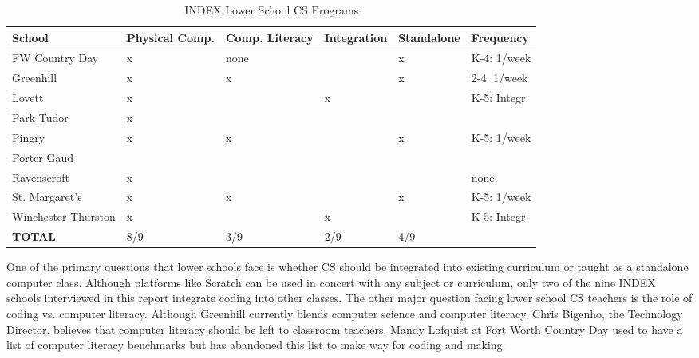 \begin{table}[]
\centering
\caption{INDEX Lower School CS Programs}
\label{indexLS}
\begin{tabular}{|l|p{1.6cm}|p{1.6cm}|p{2cm}|p{2cm}|p{2.2cm}|}\hline
\textbf{School} & \textbf{Physical Comp.}& \textbf{Comp. Literacy}& \textbf{Integration}&\textbf{Standalone}&\textbf{Frequency}  \\ \hline
FW Country Day 	& x	
				& none					%
				&						%
				& x						%
				& K-4: 1/week \\		%
Greenhill 		& x
				& x						%
				&						%
				&x 						%
				&2-4: 1/week		\\				%
Lovett 			& x	
				& 						%
				&x						%
				& 						%
				&K-5: Integr.		\\				%
Park Tudor 		& x	
				& 						%
				&						%
				& 						%
				&				\\		%
Pingry 			& x
				&x 						%
				&						%
				&x						%
				&K-5: 1/week			\\		%
Porter-Gaud 	&
				& 						%
				&						%
				& 						%
				&				\\		%
Ravenscroft 	& x
				& 						%
				&						%
				& 						%
				&none				\\		%
St. Margaret's 	& x
				&x 						%
				&						%
				&x 						%
				&K-5: 1/week					\\	%
Winchester Thurston & x
				& 						%
				&x						%
				& 						%
				&K-5: Integr.			\\\hline	%
\textbf{TOTAL}	& 8/9
				& 3/9						%
				& 2/9					%
				& 4/9					%
				&  \\\hline				%
\end{tabular}
\end{table}	
	
One of the primary questions that lower schools face is whether CS should be integrated into existing curriculum or taught as a standalone computer class. Although platforms like Scratch can be used in concert with any subject or curriculum, only two of the nine INDEX schools interviewed in this report integrate coding into other classes. The other major question facing lower school CS teachers is the role of coding vs. computer literacy. Although Greenhill currently blends computer science and computer literacy, Chris Bigenho, the Technology Director, believes that computer literacy should be left to classroom teachers. Mandy Lofquist at Fort Worth Country Day used to have a list of computer literacy benchmarks but has abandoned this list to make way for coding and making.\par
	
